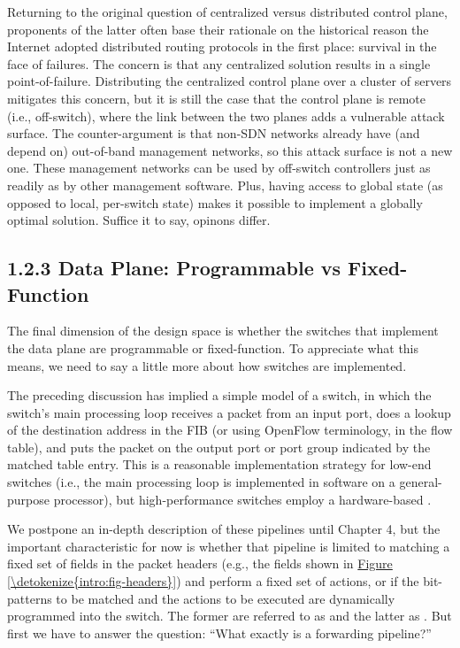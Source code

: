 \documentclass[letterpaper,11pt,english]{sphinxmanual}
\begin{document}
Returning to the original question of centralized versus distributed
control plane, proponents of the latter often base their rationale on
the historical reason the Internet adopted distributed routing
protocols in the first place: survival in the face of failures. The
concern is that any centralized solution results in a single
point-of-failure. Distributing the centralized control plane over a
cluster of servers mitigates this concern, but it is still the case
that the control plane is remote (i.e., off-switch), where the link
between the two planes adds a vulnerable attack surface. The
counter-argument is that non-SDN networks already have (and depend on)
out-of-band management networks, so this attack surface is not a new
one. These management networks can be used by off-switch controllers
just as readily as by other management software. Plus, having access
to global state (as opposed to local, per-switch state) makes it
possible to implement a globally optimal solution. Suffice it to say,
opinons differ.


\subsection{1.2.3 Data Plane: Programmable vs Fixed-Function}
\label{\detokenize{intro:data-plane-programmable-vs-fixed-function}}
The final dimension of the design space is whether the switches that
implement the data plane are programmable or fixed-function. To
appreciate what this means, we need to say a little more about how
switches are implemented.

The preceding discussion has implied a simple model of a switch, in
which the switch’s main processing loop receives a packet from an
input port, does a lookup of the destination address in the FIB (or
using OpenFlow terminology, in the flow table), and puts the packet on
the output port or port group indicated by the matched table
entry. This is a reasonable implementation strategy for low-end
switches (i.e., the main processing loop is implemented in software on
a general-purpose processor), but high-performance switches employ a
hardware-based .

We postpone an in-depth description of these pipelines until Chapter
4, but the important characteristic for now is whether that pipeline
is limited to matching a fixed set of fields in the packet headers
(e.g., the fields shown in \hyperref[\detokenize{intro:fig-headers}]{Figure \ref{\detokenize{intro:fig-headers}}}) and
perform a fixed set of actions, or if the bit-patterns to be matched
and the actions to be executed are dynamically programmed into the
switch. The former are referred to as  and
the latter as . But first we have to answer
the question: “What exactly is a forwarding pipeline?”
\end{document}
